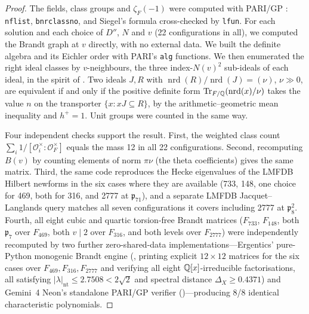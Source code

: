 \documentclass[11pt]{amsart}
\numberwithin{equation}{section}
\theoremstyle{plain}
\theoremstyle{definition}\newtheorem{definition}[theorem]{Definition}
\theoremstyle{remark}\newtheorem{remark}[theorem]{Remark}
\begin{document}
\begin{proof}
The fields, class groups and $\zeta_F(-1)$ were computed with PARI/GP \cite{pari}: \texttt{nflist}, \texttt{bnrclassno}, and Siegel's formula cross-checked by \texttt{lfun}. For each solution and each choice of $D''$, $N$ and $v$ (22 configurations in all), we computed the Brandt graph at $v$ directly, with no external data. We built the definite algebra and its Eichler order with PARI's \texttt{alg} functions. We then enumerated the right ideal classes by $v$-neighbours, the three index-$N(v)^2$ sub-ideals of each ideal, in the spirit of \cite{kv10}. Two ideals $J,R$ with $\operatorname{nrd}(R)/\operatorname{nrd}(J)=(\nu)$, $\nu\gg0$, are equivalent if and only if the positive definite form $\operatorname{Tr}_{F/\mathbb{Q}}(\operatorname{nrd}(x)/\nu)$ takes the value $n$ on the transporter $\{x: xJ\subseteq R\}$, by the arithmetic--geometric mean inequality and $h^+=1$. Unit groups were counted in the same way.

Four independent checks support the result. First, the weighted class count $\sum_i 1/[\mathcal O_i^\times:\mathcal O_F^\times]$ equals the mass 12 in all 22 configurations. Second, recomputing $B(v)$ by counting elements of norm $\pi\nu$ (the theta coefficients) gives the same matrix. Third, the same code reproduces the Hecke eigenvalues of the LMFDB Hilbert newforms \cite{lmfdb} in the six cases where they are available (733, 148, one choice for 469, both for 316, and 2777 at $\mathfrak p_{71}$), and a separate LMFDB Jacquet--Langlands query matches all seven configurations it covers including 2777 at $\mathfrak p_8^2$. Fourth, all eight cubic and quartic torsion-free Brandt matrices ($F_{733}$, $F_{148}$, both $\mathfrak p_7$ over $F_{469}$, both $v\mid2$ over $F_{316}$, and both levels over $F_{2777}$) were independently recomputed by two further zero-shared-data implementations---Ergentics' pure-Python monogenic Brandt engine (, printing explicit $12\times12$ matrices for the six cases over $F_{469},F_{316},F_{2777}$ and verifying all eight $\mathbb{Q}[x]$-irreducible factorisations, all satisfying $|\lambda|_{\mathrm{nt}}\le2.7508<2\sqrt2$ and spectral distance $\Delta_X\ge0.4371$) and Gemini~4 Neon's standalone PARI/GP verifier ()---producing 8/8 identical characteristic polynomials.
\end{proof}
\end{document}
